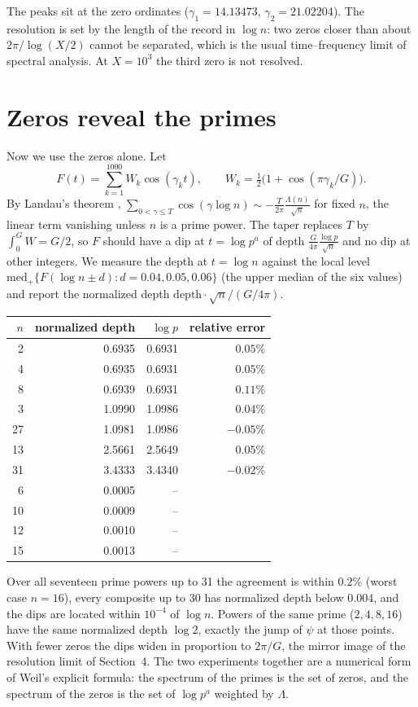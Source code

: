 \documentclass[11pt]{article}
\begin{document}
The peaks sit at the zero ordinates ($\gamma_1=14.13473$, $\gamma_2=21.02204$). The resolution is set by the length of the record in $\log n$: two zeros closer than about $2\pi/\log(X/2)$ cannot be separated, which is the usual time--frequency limit of spectral analysis. At $X=10^3$ the third zero is not resolved.

\section{Zeros reveal the primes}

Now we use the zeros alone. Let
\[
F(t)=\sum_{k=1}^{1000}W_k\cos(\gamma_k t),\qquad W_k=\tfrac12\bigl(1+\cos(\pi\gamma_k/G)\bigr).
\]
By Landau's theorem \cite{landau1912}, $\sum_{0<\gamma\le T}\cos(\gamma\log n)\sim -\frac{T}{2\pi}\frac{\Lambda(n)}{\sqrt n}$ for fixed $n$, the linear term vanishing unless $n$ is a prime power. The taper replaces $T$ by $\int_0^G W=G/2$, so $F$ should have a dip at $t=\log p^a$ of depth $\frac{G}{4\pi}\frac{\log p}{\sqrt{n}}$ and no dip at other integers. We measure the depth at $t=\log n$ against the local level $\mathrm{med}_+\{F(\log n\pm d):d=0.04,0.05,0.06\}$ (the upper median of the six values) and report the normalized depth $\mathrm{depth}\cdot\sqrt n/(G/4\pi)$.

\begin{center}
\begin{tabular}{rrrr}
\toprule
$n$ & normalized depth & $\log p$ & relative error\\
\midrule
2 & 0.6935 & 0.6931 & $0.05\%$\\
4 & 0.6935 & 0.6931 & $0.05\%$\\
8 & 0.6939 & 0.6931 & $0.11\%$\\
3 & 1.0990 & 1.0986 & $0.04\%$\\
27 & 1.0981 & 1.0986 & $-0.05\%$\\
13 & 2.5661 & 2.5649 & $0.05\%$\\
31 & 3.4333 & 3.4340 & $-0.02\%$\\
\midrule
6 & 0.0005 & -- & \\
10 & 0.0009 & -- & \\
12 & 0.0010 & -- & \\
15 & 0.0013 & -- & \\
\bottomrule
\end{tabular}
\end{center}

Over all seventeen prime powers up to 31 the agreement is within $0.2\%$ (worst case $n=16$), every composite up to 30 has normalized depth below $0.004$, and the dips are located within $10^{-4}$ of $\log n$. Powers of the same prime ($2,4,8,16$) have the same normalized depth $\log 2$, exactly the jump of $\psi$ at those points. With fewer zeros the dips widen in proportion to $2\pi/G$, the mirror image of the resolution limit of Section~4. The two experiments together are a numerical form of Weil's explicit formula: the spectrum of the primes is the set of zeros, and the spectrum of the zeros is the set of $\log p^a$ weighted by $\Lambda$.
\end{document}
